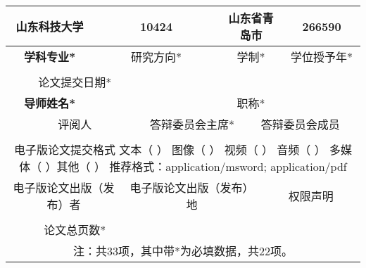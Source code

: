 {\begin{table}[htbp]
\begin{tabular}{|c|c|c|c|c|c|c|c|c|c|c|c|c|c|c|c|c|c|c|c|}
        \hline
        \multicolumn{5}{|c|}{\textbf{山东科技大学}} & \multicolumn{5}{|c|}{10424} & \multicolumn{5}{|c|}{山东省青岛市}  & \multicolumn{5}{|c|}{266590}\\
        \hline
        \multicolumn{5}{|c|}{\textbf{学科专业*}} & \multicolumn{5}{|c|}{研究方向*} & \multicolumn{5}{|c|}{学制*}  & \multicolumn{5}{|c|}{学位授予年*}\\
        \hline
        \multicolumn{5}{|c|}{\textbf{}} & \multicolumn{5}{|c|}{} & \multicolumn{5}{|c|}{}  & \multicolumn{5}{|c|}{}\\
        \hline
        \multicolumn{8}{|c|}{论文提交日期*} & \multicolumn{12}{|c|}{} \\
        \hline
        \multicolumn{5}{|c|}{\textbf{导师姓名*}} & \multicolumn{5}{|c|}{} & \multicolumn{5}{|c|}{职称*} & \multicolumn{5}{|c|}{} \\
        \hline
        \multicolumn{8}{|c|}{评阅人} & \multicolumn{5}{|c|}{答辩委员会主席*}& \multicolumn{7}{|c|}{答辩委员会成员} \\
        \hline
        \multicolumn{8}{|c|}{} & \multicolumn{5}{|c|}{}& \multicolumn{7}{|c|}{} \\
        \hline
	  \multicolumn{20}{|c|}{\newline \parbox{15cm}{电子版论文提交格式 \hspace*{0.5cm}  文本（  ） 图像（  ）  视频（ ）  音频（  ）  多媒体（  ）其他（  ）
	  推荐格式：application/msword; application/pdf}

\newline 
}\\
        \hline
        \multicolumn{7}{|c|}{电子版论文出版（发布）者} & \multicolumn{7}{|c|}{电子版论文出版（发布）地}& \multicolumn{6}{|c|}{权限声明} \\
        \hline
        \multicolumn{7}{|c|}{} & \multicolumn{7}{|c|}{}& \multicolumn{6}{|c|}{} \\
        \hline
        \multicolumn{8}{|c|}{论文总页数*} & \multicolumn{12}{|c|}{}\\
        \hline
 	   \multicolumn{20}{|c|}{注：共33项，其中带*为必填数据，共22项。}\\
        \hline

    \end{tabular}
\end{table}
}




